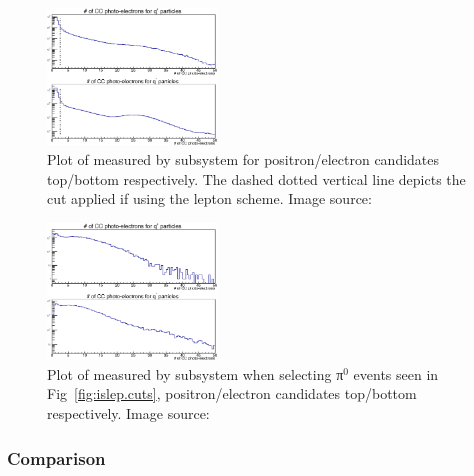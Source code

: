 %
\begin{figure}\begin{center}
\includegraphics[width=0.4\textwidth]{figures/lepton/CC_nPE.eps}
\caption[Number of Photo-electrons Measured by  for All e$^-$ and e$^+$ Candidates]{\label{fig:islep.CC}Plot of  measured by   subsystem for positron/electron candidates top/bottom respectively. The dashed dotted vertical line depicts the cut applied if using the  lepton  scheme. Image source:~\cite{clas.thesis.kunkel}}
\end{center}\end{figure}

\begin{figure}\begin{center}
\includegraphics[width=0.4\textwidth]{figures/lepton/CC_NPEcut.eps}
\caption[Number of Photo-electrons Measured by  for π$^0$ Events]{\label{fig:islep.CC1}Plot of  measured by   subsystem when selecting π$^0$ events seen in Fig~\ref{fig:islep.cuts}, positron/electron candidates top/bottom respectively. Image source:~\cite{clas.thesis.kunkel}}
\end{center}\end{figure}

\FloatBarrier






\subsubsection{\label{sec:data.lepton.ec} Comparison}

